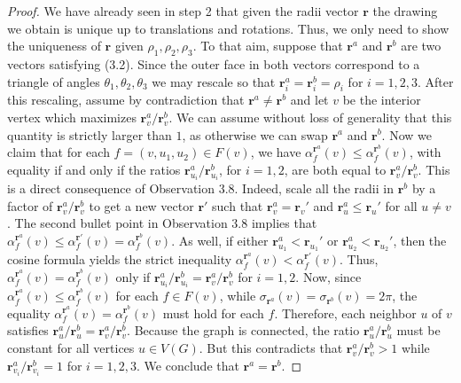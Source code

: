 \begin{proof}
We have already seen in step 2 that given the radii vector $\mathbf r$ the drawing we obtain is unique up to translations and rotations. Thus, we only need to show the uniqueness of $\mathbf r$ given $\rho_1,\rho_2,\rho_3$.
To that aim, suppose that $\mathbf r^a$ and $\mathbf r^b$ are two vectors satisfying (3.2). Since the outer face in both vectors correspond to a triangle of angles $\theta_1,\theta_2,\theta_3$ we may rescale so that $\mathbf r_i^a=\mathbf r_i^b=\rho_i$ for $i=1,2,3$. After this rescaling, assume by contradiction that $\mathbf r^a\ne\mathbf r^b$ and let $v$ be the interior vertex which maximizes $\mathbf r_v^a/\mathbf r_v^b$. We can assume without loss of generality that this quantity is strictly larger than $1$, as otherwise we can swap $\mathbf r^a$ and $\mathbf r^b$.
Now we claim that for each $f=(v,u_1,u_2)\in F(v)$, we have $\alpha_f^{\mathbf r^a}(v)\le\alpha_f^{\mathbf r^b}(v)$, with equality if and only if the ratios $\mathbf r_{u_i}^a/\mathbf r_{u_i}^b$, for $i=1,2$, are both equal to $\mathbf r_v^a/\mathbf r_v^b$. This is a direct consequence of Observation 3.8.
Indeed, scale all the radii in $\mathbf r^b$ by a factor of $\mathbf r_v^a/\mathbf r_v^b$ to get a new vector $\mathbf r'$ such that $\mathbf r_v^a=\mathbf r_v'$ and $\mathbf r_u^a\le\mathbf r_u'$ for all $u\ne v$. The second bullet point in Observation 3.8 implies that $\alpha_f^{\mathbf r^a}(v)\le\alpha_f^{\mathbf r'}(v)=\alpha_f^{\mathbf r^b}(v)$. As well, if either $\mathbf r_{u_1}^a<\mathbf r_{u_1}'$ or $\mathbf r_{u_2}^a<\mathbf r_{u_2}'$, then the cosine formula yields the strict inequality $\alpha_f^{\mathbf r^a}(v)<\alpha_f^{\mathbf r'}(v)$. Thus, $\alpha_f^{\mathbf r^a}(v)=\alpha_f^{\mathbf r^b}(v)$ only if $\mathbf r_{u_i}^a/\mathbf r_{u_i}^b=\mathbf r_v^a/\mathbf r_v^b$ for $i=1,2$.
Now, since $\alpha_f^{\mathbf r^a}(v)\le\alpha_f^{\mathbf r^b}(v)$ for each $f\in F(v)$, while $\sigma_{\mathbf r^a}(v)=\sigma_{\mathbf r^b}(v)=2\pi$, the equality $\alpha_f^{\mathbf r^a}(v)=\alpha_f^{\mathbf r^b}(v)$ must hold for each $f$. Therefore, each neighbor $u$ of $v$ satisfies $\mathbf r_u^a/\mathbf r_u^b=\mathbf r_v^a/\mathbf r_v^b$.
Because the graph is connected, the ratio $\mathbf r_u^a/\mathbf r_u^b$ must be constant for all vertices $u\in V(G)$. But this contradicts that $\mathbf r_v^a/\mathbf r_v^b>1$ while $\mathbf r_{v_i}^a/\mathbf r_{v_i}^b=1$ for $i=1,2,3$. We conclude that $\mathbf r^a=\mathbf r^b$.
\end{proof}
